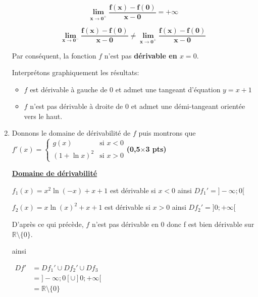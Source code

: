 \documentclass[12pt,a4paper]{article}
\begin{document}
\begin{enumerate}
          \begin{resultbox}
              \[
                  \mathbf{\lim\limits_{x \to 0^+}\frac{f(x)-f(0)}{x-0}=+\infty
                  }
              \]
          \end{resultbox}

          \begin{resultbox}
              \[
                  \mathbf{\lim\limits_{x \to 0^-}\frac{f(x)-f(0)}{x-0} \neq \lim\limits_{x \to 0^+}\frac{f(x)-f(0)}{x-0}
                  }
              \]
          \end{resultbox}

          Par conséquent, la fonction \( f \) n'est pas \textbf{dérivable en \( x = 0 \)}.

          Interprétons graphiquement les résultats:

          \begin{itemize}
              \item \( f \) est dérivable à gauche de \(0\)  et admet une tangeant d'équation \( y=x+1 \)
              \item \( f \) n'est pas dérivable à droite de \(0\)  et admet une démi-tangeant orientée vers le haut.
          \end{itemize}

    \item Donnons le domaine de dérivabilité de \( f \) puis montrons que
          \(
          f'(x) =
          \begin{cases}
              g(x)          & \text{si } x < 0 \\
              (1 + \ln x)^2 & \text{si } x > 0
          \end{cases}
          \)\hfill \textbf{(0,5$\times$3 pts)}

          \textbf{\underline{Domaine de dérivabilité}}

          \( f_{1}(x)=x^2 \ln(-x) + x + 1 \) est dérivable si \( x < 0 \) ainsi \( Df_{1}' = ]-\infty;0[\)

          \( f_{2}(x)=x \ln(x)^2 + x + 1  \) est dérivable si \(  x > 0 \) ainsi \( Df_{2}' = ]0;+\infty[\)

          D'après ce qui précède, \(f\) n'est pas dérivable en \(0\)  donc f est bien dérivable sur \(\mathbb{R}\setminus\{0\}\).

          ainsi

          \(
          \begin{aligned}
              Df' & =Df_{1}' \cup Df_{2}' \cup Df_{3} \\
                  & =]-\infty;0[ \cup ]0;+\infty[     \\
                  & =\mathbb{R}\setminus\{0\}
          \end{aligned}
          \)


\end{enumerate}
\end{document}
